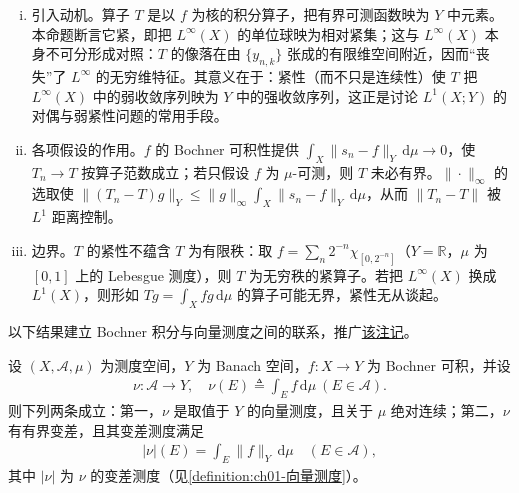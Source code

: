 \documentclass[../../main.tex]{subfiles}%
\begin{document}
\begin{remark}\label{remark:ch04-紧算子动机}
\begin{enumerate}[(i)]
\item 引入动机。算子 $T$ 是以 $f$ 为核的积分算子，把有界可测函数映为 $Y$ 中元素。本命题断言它紧，即把 $L^\infty(X)$ 的单位球映为相对紧集；这与 $L^\infty(X)$ 本身不可分形成对照：$T$ 的像落在由 $\{y_{n,k}\}$ 张成的有限维空间附近，因而“丧失”了 $L^\infty$ 的无穷维特征。其意义在于：紧性（而不只是连续性）使 $T$ 把 $L^\infty(X)$ 中的弱收敛序列映为 $Y$ 中的强收敛序列，这正是讨论 $L^1(X;Y)$ 的对偶与弱紧性问题的常用手段。

\item 各项假设的作用。$f$ 的 Bochner 可积性提供 $\int_X\|s_n-f\|_Y\,\mathrm{d}\mu\to0$，使 $T_n\to T$ 按算子范数成立；若只假设 $f$ 为 $\mu$-可测，则 $T$ 未必有界。$\|\cdot\|_\infty$ 的选取使 $\|(T_n-T)g\|_Y\leqslant\|g\|_\infty\int_X\|s_n-f\|_Y\,\mathrm{d}\mu$，从而 $\|T_n-T\|$ 被 $L^1$ 距离控制。

\item 边界。$T$ 的紧性不蕴含 $T$ 为有限秩：取 $f=\sum_{n}2^{-n}\chi_{[0,2^{-n}]}$（$Y=\mathbb{R}$，$\mu$ 为 $[0,1]$ 上的 Lebesgue 测度），则 $T$ 为无穷秩的紧算子。若把 $L^\infty(X)$ 换成 $L^1(X)$，则形如 $Tg=\int_Xfg\,\mathrm{d}\mu$ 的算子可能无界，紧性无从谈起。
\end{enumerate}
\end{remark}

以下结果建立 Bochner 积分与向量测度之间的联系，推广\hyperref[remark:ch02-简单积分]{该注记}。

\begin{proposition}\label{proposition:ch04-积分诱导向量测度}
设 $(X,\mathcal{A},\mu)$ 为测度空间，$Y$ 为 Banach 空间，$f:X\to Y$ 为 Bochner 可积，并设
\begin{align}
\nu:\mathcal{A}\to Y,\quad \nu(E)\triangleq \int_E f\,\mathrm{d}\mu\ (E\in\mathcal{A}). \label{align:ch04-4.45}
\end{align}
则下列两条成立：第一，$\nu$ 是取值于 $Y$ 的向量测度，且关于 $\mu$ 绝对连续；第二，$\nu$ 有有界变差，且其变差测度满足
\begin{align}
|\nu|(E)=\int_E\|f\|_Y\,\mathrm{d}\mu\quad(E\in\mathcal{A}), \label{align:ch04-4.46}
\end{align}
其中 $|\nu|$ 为 $\nu$ 的变差测度（见\cref{definition:ch01-向量测度}）。
\end{proposition}
\end{document}
